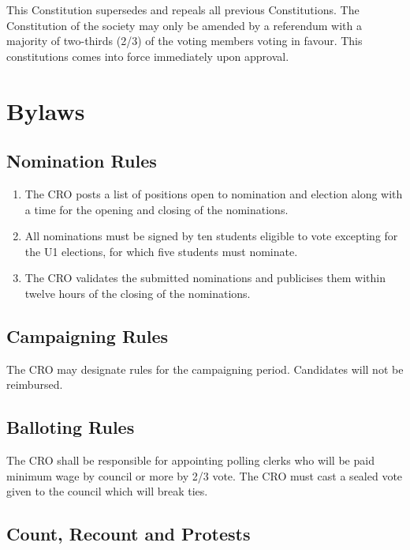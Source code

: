 This Constitution supersedes and repeals all previous Constitutions. The
Constitution of the society may only be amended by a referendum with a
majority of two-thirds (2/3) of the voting members voting in favour.
This constitutions comes into force immediately upon approval.

\section{Bylaws}\label{bylaws}

\subsection{Nomination Rules}\label{nomination-rules}

\begin{enumerate}
\def\labelenumi{\arabic{enumi}.}
\item
  The CRO posts a list of positions open to nomination and election
  along with a time for the opening and closing of the nominations.
\item
  All nominations must be signed by ten students eligible to vote
  excepting for the U1 elections, for which five students must nominate.
\item
  The CRO validates the submitted nominations and publicises them within
  twelve hours of the closing of the nominations.
\end{enumerate}

\subsection{Campaigning Rules}\label{campaigning-rules}

The CRO may designate rules for the campaigning period. Candidates will
not be reimbursed.

\subsection{Balloting Rules}\label{balloting-rules}

The CRO shall be responsible for appointing polling clerks who will be
paid minimum wage by council or more by 2/3 vote. The CRO must cast a
sealed vote given to the council which will break ties.

\subsection{Count, Recount and
Protests}\label{count-recount-and-protests}

